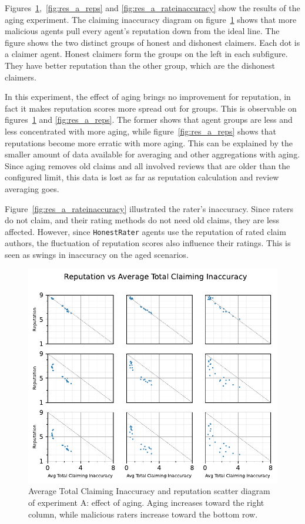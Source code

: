 \documentclass[%
    ]{\PathToTumTemplate/thesis/tum_thesis}
\begin{document}
Figures~\ref{fig:res_a_scatter},~\ref{fig:res_a_reps} and \ref{fig:res_a_rateinaccuracy} show the results of the aging experiment.
The claiming inaccuracy diagram on figure~\ref{fig:res_a_scatter} shows that more malicious agents pull every agent's reputation down from the ideal line.
The figure shows the two distinct groups of honest and dishonest claimers.
Each dot is a claimer agent.
Honest claimers form the groups on the left in each subfigure.
They have better reputation than the other group, which are the dishonest claimers.

In this experiment, the effect of aging brings no improvement for reputation, in fact it makes reputation scores more spread out for groups.
This is observable on figures~\ref{fig:res_a_scatter} and \ref{fig:res_a_reps}.
The former shows that agent groups are less and less concentrated with more aging, while figure~\ref{fig:res_a_reps} shows that reputations become more erratic with more aging.
This can be explained by the smaller amount of data available for averaging and other aggregations with aging.
Since aging removes old claims and all involved reviews that are older than the configured limit, this data is lost as far as reputation calculation and review averaging goes.

Figure~\ref{fig:res_a_rateinaccuracy} illustrated the rater's inaccuracy. Since raters do not claim, and their rating methods do not need old claims, they are less affected. 
However, since \texttt{HonestRater} agents use the reputation of rated claim authors, the fluctuation of reputation scores also influence their ratings. 
This is seen as swings in inaccuracy on the aged scenarios.

\begin{figure}[tbp]
  \begin{center}
        \includegraphics[width=0.75\linewidth]	{../results/a/AvgTotClaimInaccuracyAndReputationScatter_joined.pdf}
    \caption{
    Average Total Claiming Inaccuracy and reputation scatter diagram of experiment A: effect of aging.
    Aging increases toward the right column, while malicious raters increase toward the bottom row.
    }
    \label{fig:res_a_scatter}
  \end{center}
\end{figure}
\end{document}
